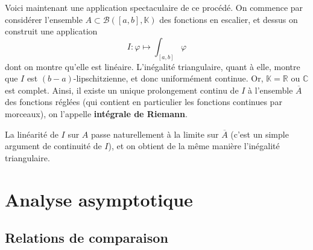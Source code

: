 \documentclass[french]{book}
\newcommand{\R}{\mathbb{R}}
\newcommand{\C}{\mathbb{C}}
\newcommand{\K}{\mathbb{K}}
\theoremstyle{plain}
\theoremstyle{definition}
\theoremstyle{remark}
\begin{document}
Voici maintenant une application spectaculaire de ce procédé. On commence par considérer l'ensemble $A \subset \mathcal{B}([a,b], \mathbb{K})$ des fonctions en escalier, et dessus on construit une application $$I: \varphi \mapsto \int_{[a,b]} \varphi$$ dont on montre qu'elle est linéaire. L'inégalité triangulaire, quant à elle, montre que $I$ est $(b-a)$-lipschitzienne, et donc uniformément continue. Or, $\K=\R$ ou $\C$ est complet. Ainsi, il existe un unique prolongement continu de $I$ à l'ensemble $\overline{A}$ des fonctions réglées (qui contient en particulier les fonctions continues par morceaux), on l'appelle \textbf{intégrale de Riemann}. \par La linéarité de $I$ sur $A$ passe naturellement à la limite sur $\overline{A}$ (c'est un simple argument de continuité de $I$), et on obtient de la même manière l'inégalité triangulaire.


\newpage
\chapter{Analyse asymptotique}
\section{Relations de comparaison}
\end{document}
